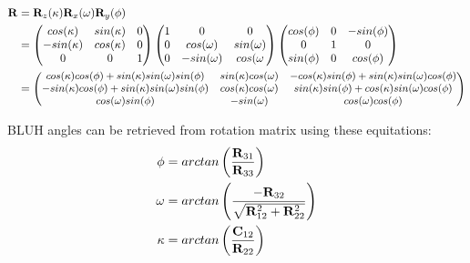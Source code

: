 \documentclass[a4paper,12pt]{article}
\newcommand{\ematr}[1]{
{\bf #1}
}
\newcommand{\escal}[1]{
{\it #1}
}
\begin{document}
 \begin{equation}
 \begin{split}
\ematr{R} &= \ematr{R}_{z}(\escal{\kappa}) \ematr{R}_{x}(\escal{\omega}) \ematr{R}_{y}(\escal{\phi}) \\
	  &= \begin{pmatrix}
	      cos(\escal{\kappa}) & sin(\escal{\kappa}) & 0 \\
	      -sin(\escal{\kappa}) & cos(\escal{\kappa}) & 0 \\
	      0 & 0 & 1
	      \end{pmatrix}
	      \begin{pmatrix}
	      1 & 0 & 0 \\
	      0 & cos(\escal{\omega}) & sin(\escal{\omega}) \\
	      0 & -sin(\escal{\omega}) & cos(\escal{\omega} 
	      \end{pmatrix}
	      \begin{pmatrix}
	      cos(\escal{\phi}) & 0 & -sin(\escal{\phi}) \\
	      0 & 1 & 0 \\
	      sin(\phi) & 0 & cos(\phi)      
	      \end{pmatrix} \\
	  &=  
	      \small
	      \begin{pmatrix}
	      cos(\escal{\kappa}) cos(\escal{\phi}) + sin(\escal{\kappa}) sin(\escal{\omega}) sin(\escal{\phi}) & 
	      sin(\escal{\kappa}) cos(\escal{\omega})  & 
	      -cos(\escal{\kappa}) sin(\escal{\phi}) + sin(\escal{\kappa}) sin(\escal{\omega}) cos(\escal{\phi}) 
	      \\
	      -sin(\escal{\kappa}) cos(\escal{\phi}) + sin(\escal{\kappa}) sin(\escal{\omega}) sin(\escal{\phi}) & 
	      cos(\escal{\kappa}) cos(\escal{\omega})  & 
	      sin(\escal{\kappa}) sin(\escal{\phi}) + cos(\escal{\kappa}) sin(\escal{\omega}) cos(\escal{\phi}) 
	      \\	      
	      cos(\escal{\omega}) sin(\escal{\phi}) & 
	      -sin(\escal{\omega})  & 
	      cos(\escal{\omega}) cos(\escal{\phi}) 
	      \\		      
	      \end{pmatrix} 
\end{split}
\end{equation}

BLUH angles can be retrieved from rotation matrix using these equitations: 
 \begin{equation}
 \begin{split}
\escal{\phi} &=  arctan \left(\frac{\ematr{R}_{31}}{\ematr{R}_{33}} \right)\\
\escal{\omega} &= arctan \left(\frac{-\ematr{R}_{32}}{ \sqrt{ \ematr{R}_{12}^{2} + \ematr{R}_{22}^{2} }} \right)\\
\escal{\kappa} &=  arctan \left(\frac{\ematr{C}_{12}}{\ematr{R}_{22}} \right)
\end{split}
\end{equation}
\end{document}
